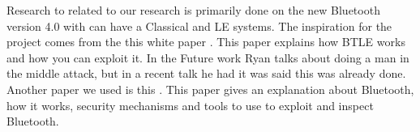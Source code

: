 Research to related to our research is primarily done on the new Bluetooth version 4.0 with can have a Classical and LE systems. The inspiration for the project comes from the this white paper \cite{mryan2014ble}. This paper explains how BTLE works and how you can exploit it. In the Future work Ryan talks about doing a man in the middle attack, but in a recent talk he had \cite{hitbox_mike_ryan} it was said this was already done. Another paper we used is this \cite{chai20126}. This paper gives an explanation about Bluetooth, how it works, security mechanisms and tools to use to exploit and inspect Bluetooth. 